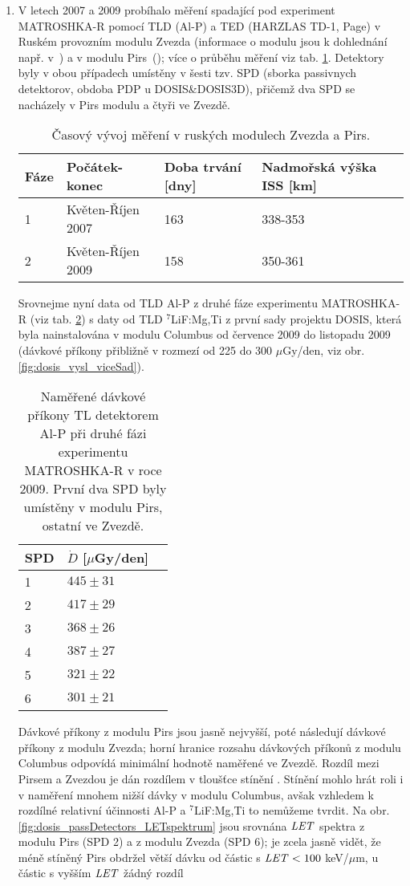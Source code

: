 \begin{enumerate}
\item V letech 2007 a 2009 probíhalo měření spadající pod experiment MATROSHKA-R pomocí TLD (Al-P) a TED (HARZLAS TD-1, Page) v Ruském provozním modulu Zvezda (informace o modulu jsou k dohlednání např. v~\cite{serviceModule}) a v modulu Pirs~(\cite{piers1}); více o průběhu měření viz tab. \ref{tab:dosis_passDetectors_timeline}. Detektory byly v obou případech umístěny v šesti tzv. SPD (sborka passivnych detektorov, obdoba PDP u DOSIS\&DOSIS3D), přičemž dva SPD se nacházely v Pirs modulu a čtyři ve Zvezdě. 
\begin{table}[h]
  \centering
  \caption{Časový vývoj měření v ruských modulech Zvezda a Pirs. \cite{passDetectors}}
  \label{tab:dosis_passDetectors_timeline}
  \begin{tabular}{llll}
	\toprule
	Fáze&Počátek-konec&Doba trvání [dny]&Nadmořská výška ISS [km]\\
	\midrule
	1&Květen-Říjen 2007&163&338-353\\
	2&Květen-Říjen 2009&158&350-361\\
	\bottomrule
  \end{tabular}
\end{table}
Srovnejme nyní data od TLD Al-P z druhé fáze experimentu MATROSHKA-R (viz tab. \ref{tab:dosis_passDetectors_vysledky}) s daty od TLD $^7$LiF:Mg,Ti z první sady projektu DOSIS, která byla nainstalována v modulu Columbus od července 2009 do listopadu 2009 (dávkové příkony přibližně v rozmezí od 225 do 300 $\mu$Gy/den, viz obr. \ref{fig:dosis_vysl_viceSad}). 
\begin{table}[h]
  \centering
  \caption{Naměřené dávkové příkony TL detektorem Al-P při druhé fázi experimentu MATROSHKA-R v roce 2009. První dva SPD byly umístěny v modulu Pirs, ostatní ve Zvezdě. \cite{passDetectors}}
  \label{tab:dosis_passDetectors_vysledky}
  \begin{tabular}{lll}
	\toprule
	SPD&$\dot{D}$ [$\mu$Gy/den]\\
	\midrule
	1&$445\pm31$\\
	2&$417\pm29$\\
	3&$368\pm26$\\
	4&$387\pm27$\\
	5&$321\pm22$\\
	6&$301\pm21$\\
	\bottomrule
  \end{tabular}
\end{table}
Dávkové příkony z modulu Pirs jsou jasně nejvyšší, poté následují dávkové příkony z modulu Zvezda; horní hranice rozsahu dávkových příkonů z modulu Columbus odpovídá minimální hodnotě naměřené ve Zvezdě. Rozdíl mezi Pirsem a Zvezdou je dán rozdílem v tloušťce stínění \cite{passDetectors}. Stínění mohlo hrát roli i v naměření mnohem nižší dávky v modulu Columbus, avšak vzhledem k rozdílné relativní účinnosti Al-P a $^7$LiF:Mg,Ti to nemůžeme tvrdit. Na obr. \ref{fig:dosis_passDetectors_LETspektrum} jsou srovnána $\mathit{LET}$ spektra z modulu Pirs (SPD 2) a z modulu Zvezda (SPD 6); je zcela jasně vidět, že méně stíněný Pirs obdržel větší dávku od částic s $\mathit{LET}<100$ keV/$\mu$m, u částic s vyšším $\mathit{LET}$ žádný rozdíl

\end{enumerate}
